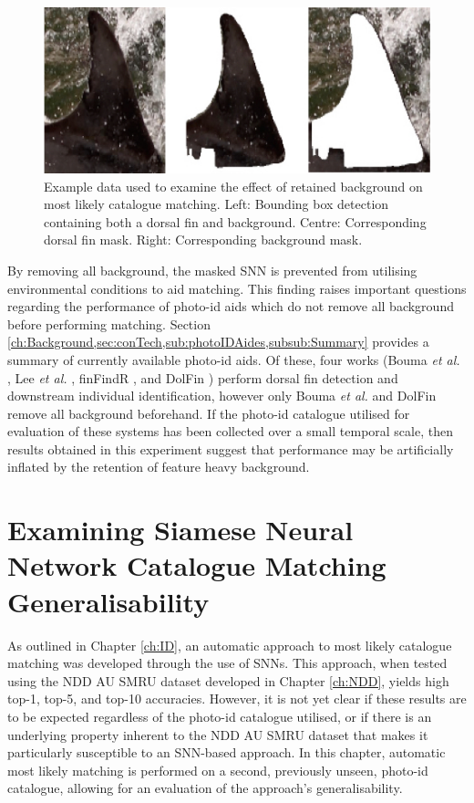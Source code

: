 \begin{figure}
	\begin{center}
		\includegraphics[scale=0.5]{Chapter6/figs/embedding-check-images.jpg}
	\end{center}
	\caption[Example data used to examine the effect of retained background on most likely catalogue matching.]{Example data used to examine the effect of retained background on most likely catalogue matching. Left: Bounding box detection containing both a dorsal fin and background. Centre: Corresponding dorsal fin mask. Right: Corresponding background mask.}
	\label{fig:bboxvsmask}
\end{figure}

By removing all background, the masked SNN is prevented from utilising environmental conditions to aid matching. This finding raises important questions regarding the performance of photo-id aids which do not remove all background before performing matching. Section \ref{ch:Background,sec:conTech,sub:photoIDAides,subsub:Summary} provides a summary of currently available photo-id aids. Of these, four works (Bouma \textit{et al.} \cite{bouma_individual_2018}, Lee \textit{et al.} \cite{lee_backbone_2020}, finFindR \cite{thompson_finfindr_2022}, and DolFin \cite{maglietta_dolfin_2018}) perform dorsal fin detection and downstream individual identification, however only Bouma \textit{et al.} and DolFin remove all background beforehand. If the photo-id catalogue utilised for evaluation of these systems has been collected over a small temporal scale, then results obtained in this experiment suggest that performance may be artificially inflated by the retention of feature heavy background. 

\section{Examining Siamese Neural Network Catalogue Matching Generalisability }\label{ch:SNNEvaluation,sec:SDRP}

As outlined in Chapter \ref{ch:ID}, an automatic approach to most likely catalogue matching was developed through the use of SNNs. This approach, when tested using the NDD AU SMRU dataset developed in Chapter \ref{ch:NDD}, yields high top-1, top-5, and top-10 accuracies. However, it is not yet clear if these results are to be expected regardless of the photo-id catalogue utilised, or if there is an underlying property inherent to the NDD AU SMRU dataset that makes it particularly susceptible to an SNN-based approach. In this chapter, automatic most likely matching is performed on a second, previously unseen, photo-id catalogue, allowing for an evaluation of the approach's generalisability.

